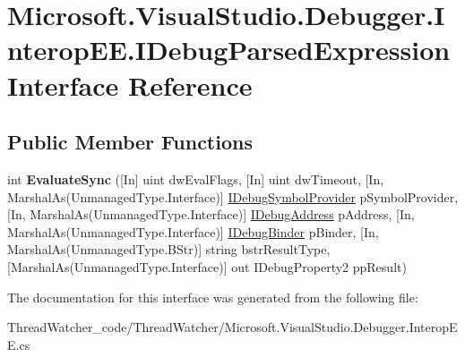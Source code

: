 \hypertarget{interface_microsoft_1_1_visual_studio_1_1_debugger_1_1_interop_e_e_1_1_i_debug_parsed_expression}{\section{Microsoft.\+Visual\+Studio.\+Debugger.\+Interop\+E\+E.\+I\+Debug\+Parsed\+Expression Interface Reference}
\label{interface_microsoft_1_1_visual_studio_1_1_debugger_1_1_interop_e_e_1_1_i_debug_parsed_expression}
}
\subsection*{Public Member Functions}
\begin{DoxyCompactItemize}
\item 
\hypertarget{interface_microsoft_1_1_visual_studio_1_1_debugger_1_1_interop_e_e_1_1_i_debug_parsed_expression_a4a1623f1d44347341fbdb06f88eff0df}{int {\bfseries Evaluate\+Sync} (\mbox{[}In\mbox{]} uint dw\+Eval\+Flags, \mbox{[}In\mbox{]} uint dw\+Timeout, \mbox{[}In, Marshal\+As(Unmanaged\+Type.\+Interface)\mbox{]} \hyperlink{interface_microsoft_1_1_visual_studio_1_1_debugger_1_1_interop_e_e_1_1_i_debug_symbol_provider}{I\+Debug\+Symbol\+Provider} p\+Symbol\+Provider, \mbox{[}In, Marshal\+As(Unmanaged\+Type.\+Interface)\mbox{]} \hyperlink{interface_microsoft_1_1_visual_studio_1_1_debugger_1_1_interop_e_e_1_1_i_debug_address}{I\+Debug\+Address} p\+Address, \mbox{[}In, Marshal\+As(Unmanaged\+Type.\+Interface)\mbox{]} \hyperlink{interface_microsoft_1_1_visual_studio_1_1_debugger_1_1_interop_e_e_1_1_i_debug_binder}{I\+Debug\+Binder} p\+Binder, \mbox{[}In, Marshal\+As(Unmanaged\+Type.\+B\+Str)\mbox{]} string bstr\+Result\+Type, \mbox{[}Marshal\+As(Unmanaged\+Type.\+Interface)\mbox{]} out I\+Debug\+Property2 pp\+Result)}\label{interface_microsoft_1_1_visual_studio_1_1_debugger_1_1_interop_e_e_1_1_i_debug_parsed_expression_a4a1623f1d44347341fbdb06f88eff0df}

\end{DoxyCompactItemize}


The documentation for this interface was generated from the following file\+:\begin{DoxyCompactItemize}
\item 
Thread\+Watcher\+\_\+code/\+Thread\+Watcher/Microsoft.\+Visual\+Studio.\+Debugger.\+Interop\+E\+E.\+cs\end{DoxyCompactItemize}
